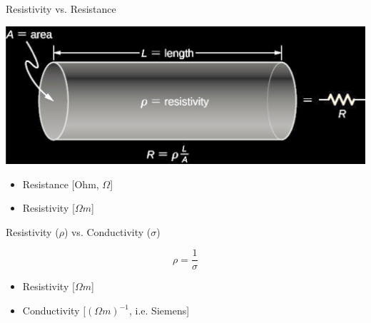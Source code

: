 \begin{frame}
  \begin{PointSix}{Resistivity vs. Resistance}
   \begin{center}
     \includegraphics[width=0.90\linewidth]{Figures/Resistivity/ResistanceResistivity.png}
   \end{center}
   \small
   \begin{itemize}
     \item Resistance [Ohm, $\Omega$]
     \item Resistivity [$\Omega m$]
   \end{itemize}
   \end{PointSix}
\end{frame}

\begin{frame}
  \begin{PointSix}{Resistivity ($\rho$) vs. Conductivity ($\sigma$)}
   \begin{center}
     $$
      \rho = \frac{1}{\sigma}
     $$
   \end{center}
   \small
   \begin{itemize}
     \item Resistivity [$\Omega m$]
     \item Conductivity [$(\Omega m)^{-1}$, i.e. Siemens]
   \end{itemize}
   \end{PointSix}
\end{frame}

